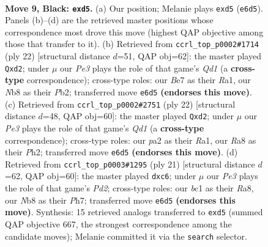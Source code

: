 \documentclass[11pt]{article}
\begin{document}
\clearpage

\begin{figure}[p]\centering
\begin{subfigure}{0.46\textwidth}\centering
\resizebox{\linewidth}{!}{%
\newchessgame
\chessboard[
  setfen={rnbq1rk1/ppp1bp1p/4p1p1/3B4/2NP4/6P1/PP2PP1P/RNBQ1RK1 b - - 0 9},
  showmover=false,
  pgfstyle=straightmove, color=movearrow, markmove={e6-d5}
]}
\caption{}
\end{subfigure}\hfill
\begin{subfigure}{0.46\textwidth}\centering
\resizebox{\linewidth}{!}{%
\newchessgame
\chessboard[
  setfen={r1b1k2r/1pp1qppp/3p4/p3n3/2P2B2/P3P3/1P1bBPPP/R2Q1RK1 w kq - 0 12},
  showmover=false,
  pgfstyle=straightmove, color=movearrow, markmove={d1-d2}
]}
\caption{}
\end{subfigure}
\\[4pt]
\begin{subfigure}{0.46\textwidth}\centering
\resizebox{\linewidth}{!}{%
\newchessgame
\chessboard[
  setfen={r1b2rk1/ppp1qppp/3p4/4n3/2P2B2/P3P3/1P1bBPPP/R2Q1RK1 w - - 0 12},
  showmover=false,
  pgfstyle=straightmove, color=movearrow, markmove={d1-d2}
]}
\caption{}
\end{subfigure}\hfill
\begin{subfigure}{0.46\textwidth}\centering
\resizebox{\linewidth}{!}{%
\newchessgame
\chessboard[
  setfen={r1bq1rk1/1p1pppbp/p1B3p1/4P3/3P4/2P2N2/P4PPP/R1BQ1RK1 b - - 0 11},
  showmover=false,
  pgfstyle=straightmove, color=movearrow, markmove={d7-c6}
]}
\caption{}
\end{subfigure}
\caption{\textbf{Move 9, Black: \texttt{exd5}.} (a) Our position; Melanie plays \texttt{exd5} (\texttt{e6d5}). Panels (b)--(d) are the retrieved master positions whose correspondence most drove this move (highest QAP objective among those that transfer to it). (b) Retrieved from \texttt{ccrl\_top\_p0002\#1714} (ply 22) [structural distance $d$=51, QAP obj=62]: the master played \texttt{Qxd2}; under $\mu$ our \emph{Pe3} plays the role of that game's \emph{Qd1} (a \textbf{cross-type} correspondence); cross-type roles: our \emph{B}e7 as their \emph{R}a1, our \emph{N}b8 as their \emph{P}b2; transferred move \texttt{e6d5} \textbf{(endorses this move)}. (c) Retrieved from \texttt{ccrl\_top\_p0002\#2751} (ply 22) [structural distance $d$=48, QAP obj=60]: the master played \texttt{Qxd2}; under $\mu$ our \emph{Pe3} plays the role of that game's \emph{Qd1} (a \textbf{cross-type} correspondence); cross-type roles: our \emph{p}a2 as their \emph{R}a1, our \emph{R}a8 as their \emph{P}h2; transferred move \texttt{e6d5} \textbf{(endorses this move)}. (d) Retrieved from \texttt{ccrl\_top\_p0003\#1295} (ply 21) [structural distance $d$=62, QAP obj=60]: the master played \texttt{dxc6}; under $\mu$ our \emph{Pe3} plays the role of that game's \emph{Pd2}; cross-type roles: our \emph{b}c1 as their \emph{R}a8, our \emph{N}b8 as their \emph{P}h7; transferred move \texttt{e6d5} \textbf{(endorses this move)}. Synthesis: 15 retrieved analogs transferred to \texttt{exd5} (summed QAP objective 667, the strongest correspondence among the candidate moves); Melanie committed it via the \texttt{search} selector.}
\label{fig:thought-m17}
\end{figure}
\end{document}
